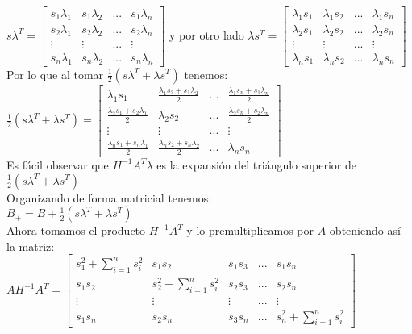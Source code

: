 \documentclass[12pt]{article}
\begin{document}
$s\lambda^{T} =
\begin{bmatrix}
s_{1}\lambda_{1} & s_{1}\lambda_{2} & ... & s_{1}\lambda_{n} \\
s_{2}\lambda_{1} & s_{2}\lambda_{2} & ... & s_{2}\lambda_{n} \\
\vdots & \vdots & ... & \vdots \\
s_{n}\lambda_{1} & s_{n}\lambda_{2} & ... & s_{n}\lambda_{n}
\end{bmatrix}$ y por otro lado
$\lambda s^{T} =
\begin{bmatrix}
\lambda_{1}s_{1} & \lambda_{1}s_{2} & ... & \lambda_{1}s_{n} \\
\lambda_{2}s_{1} & \lambda_{2}s_{2} & ... & \lambda_{2}s_{n} \\
\vdots & \vdots & ... & \vdots \\
\lambda_{n}s_{1} & \lambda_{n}s_{2} & ... & \lambda_{n}s_{n}
\end{bmatrix}$
\\
Por lo que al tomar $\frac{1}{2} (s\lambda^{T} + \lambda s^{T})$ tenemos:
$\frac{1}{2} (s\lambda^{T} + \lambda s^{T}) =
\begin{bmatrix}
\lambda_{1}s_{1} & \frac{\lambda_{1}s_{2} + s_{1}\lambda_{2}}{2} & ... & \frac{\lambda_{1}s_{n} + s_{1}\lambda_{n}}{2} \\
\frac{\lambda_{2}s_{1} + s_{2}\lambda_{1}}{2} & \lambda_{2}s_{2} & ... & \frac{\lambda_{2}s_{n} + s_{2}\lambda_{n}}{2} \\
\vdots & \vdots & ... & \vdots \\
\frac{\lambda_{n}s_{1} + s_{n}\lambda_{1}}{2} & \frac{\lambda_{n}s_{2} + s_{n}\lambda_{2}}{2} & ... & \lambda_{n}s_{n}
\end{bmatrix}$
\\
Es f\'acil observar que $H^{-1}A^{T}\lambda$ es la expansi\'on del tri\'angulo superior de $\frac{1}{2} (s\lambda^{T} + \lambda s^{T})$
\\
Organizando de forma matricial tenemos:
\\
$B_{+} = B + \frac{1}{2} (s\lambda^{T} + \lambda s^{T})$
\\
Ahora tomamos el producto $H^{-1}A^{T}$ y lo premultiplicamos por $A$ obteniendo as\'i la matriz:
\\
$AH^{-1}A^{T}=
\begin{bmatrix}
s_{1}^{2} + \sum \limits_{i=1}^{n} s_{i}^{2} & s_{1}s_{2} & s_{1}s_{3} & ... & s_{1}s_{n} \\
s_{1}s_{2} & s_{2}^{2} + \sum \limits_{i=1}^{n} s_{i}^{2} & s_{2}s_{3} & ... & s_{2}s_{n} \\
\vdots & \vdots & \vdots & ... & \vdots \\
s_{1}s_{n} & s_{2}s_{n} & s_{3}s_{n} & ... & s_{n}^{2} + \sum \limits_{i=1}^{n} s_{i}^{2}
\end{bmatrix}$
\end{document}
